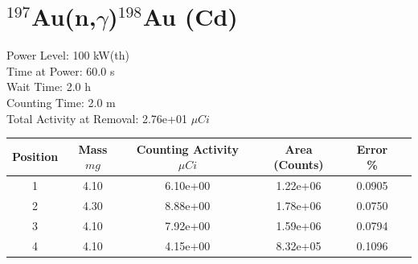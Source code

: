 \newpage

\section*{ $^{197}$Au(n,$\gamma$)$^{198}$Au (Cd) }

Power Level: 100 kW(th) \\
Time at Power: 60.0 s \\
Wait Time:  2.0 h \\
Counting Time:  2.0 m \\
Total Activity at Removal: 2.76e+01 $\mu Ci$

\begin{table}[h]
\centering
\begin{tabular}{ |c|c|c|c|c|c| }
 \hline
 Position & Mass $mg$ & Counting Activity $\mu Ci$ & Area (Counts) & Error \% \\
 \hline 
 1 & 4.10 & 6.10e+00 & 1.22e+06 & 0.0905 \\ 
\hline
 2 & 4.30 & 8.88e+00 & 1.78e+06 & 0.0750 \\ 
\hline
 3 & 4.10 & 7.92e+00 & 1.59e+06 & 0.0794 \\ 
\hline
 4 & 4.10 & 4.15e+00 & 8.32e+05 & 0.1096 \\ 
\hline
\end{tabular}
\end{table}

